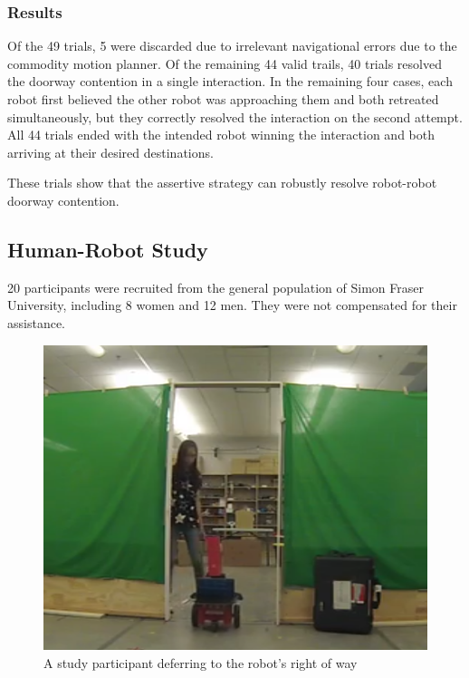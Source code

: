 \documentclass[letterpaper, 10 pt, conference]{ieeeconf}  %
\begin{document}
\subsubsection{Results}

Of the 49 trials, 5 were discarded due to irrelevant navigational errors due to the commodity motion planner. Of the remaining 44 valid trails, 40 trials resolved the doorway contention in a single interaction. In the remaining four cases, each robot first believed the other robot was approaching them and both retreated simultaneously, but they correctly resolved the interaction on the second attempt. All 44 trials ended with the intended robot winning the interaction and both arriving at their desired destinations.

These trials show that the assertive strategy can robustly resolve robot-robot doorway contention. 

\subsection{Human-Robot Study}

20 participants were recruited from the general population of Simon Fraser University, including 8 women and 12 men. They were not compensated for their assistance.

     \begin{figure}
      \centering
      \includegraphics[width=\columnwidth]{test_example.png}
      \caption{A study participant deferring to the robot's right of way}
      \label{fig:Example}
   \end{figure}
\end{document}
